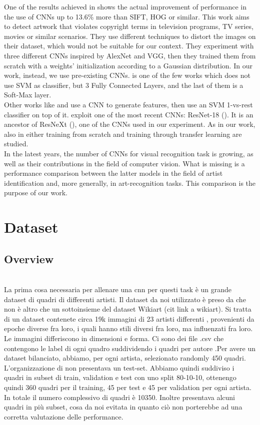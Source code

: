 \documentclass{article}
\begin{document}
One of the results achieved in \cite{hong2017} shows the actual improvement of performance in the use of CNNs up to 13.6\% more than SIFT, HOG or similar.  This work aims to detect artwork that violates copyright terms in television programs, TV series, movies or similar scenarios. They use different techniques to distort the images on their dataset, which would not be suitable for our context. They experiment with three different CNNs inspired by AlexNet and VGG, then they trained them from scratch with a weights' initialization according to a Gaussian distribution. In our work, instead, we use pre-existing CNNs. \cite{hong2017} is one of the few works which does not use SVM as classifier, but 3 Fully Connected Layers, and the last of them is a Soft-Max layer.\\
Other works like \cite{Bar2014} and \cite{razavian2014} use a CNN to generate features, then use an SVM 1-vs-rest classifier on top of it.
\cite{ArtistIdCNN406} exploit one of the most recent CNNs: ResNet-18 (\cite{resnet}). It is an ancestor of ResNeXt (\cite{resneXt}), one of the CNNs used in our experiment. As in our work, also in \cite{ArtistIdCNN406} either training from scratch and training through transfer learning are studied.
\\

In the latest years, the number of CNNs for visual recognition task is growing, as well as their contributions in the field of computer vision. What is missing is a performance comparison between the latter models in the field of artist identification and, more generally, in art-recognition tasks. This comparison is the purpose of our work.

\section{Dataset}\label{dataset}


\subsection{Overview}\mbox{}\\
La prima cosa necessaria per allenare una cnn per questi task è un grande dataset di quadri di differenti artisti. Il dataset da noi utilizzato è preso da \cite{ArtGANDataset} che non è altro che un sottoinsieme del dataset Wikiart (cit link a wikiart). Si tratta di un dataset contenete circa 19k immagini di 23 artisti differenti , provenienti da epoche diverse fra loro, i quali hanno stili diversi fra loro, ma influenzati fra loro. Le immagini differiscono in dimensioni e forma.  Ci sono dei file .csv che contengono le label di ogni quadro suddividendo i quadri per  autore .Per avere un dataset bilanciato, abbiamo, per ogni artista, selezionato randomly 450 quadri.
L'organizzazione di \cite{ArtGANDataset} non presentava un test-set. Abbiamo quindi suddiviso i quadri in subset di train, validation e test con uno split 80-10-10, ottenengo quindi 360 quadri per il training, 45 per test e 45 per validation per ogni artista. In totale il numero complessivo di quadri è 10350.
Inoltre \cite{ArtGANDataset} presentava alcuni quadri in più subset, cosa da noi evitata in quanto ciò non porterebbe ad una corretta valutazione delle performance.
\end{document}
